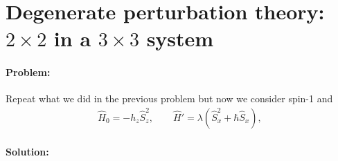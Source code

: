 \documentclass[10pt]{article}
\newcommand{\1}{\mathbf 1}
\begin{document}


\newpage






\section*{Degenerate perturbation theory: $2 \times 2$ in a $3 \times 3$ system}

\paragraph{Problem:}

Repeat what we did in the previous problem but now we consider spin-1 and
\begin{align}
	\hat H_0 = - h_z \hat S_z^2,
	\qquad 
	\hat H' = \lambda (\hat S_x^2 +\hbar \hat S_x),
\end{align}

\paragraph{Solution:}
\end{document}
